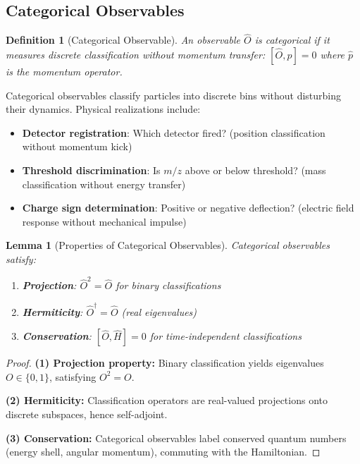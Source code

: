 \documentclass[twocolumn,10pt]{article}
\newtheorem{lemma}[theorem]{Lemma}
\newtheorem{definition}[theorem]{Definition}
\begin{document}
\subsection{Categorical Observables}

\begin{definition}[Categorical Observable]
\label{def:categorical}
An observable $\hat{O}$ is \emph{categorical} if it measures discrete classification without momentum transfer:
$
[\hat{O}, \hat{p}] = 0
$
where $\hat{p}$ is the momentum operator.
\end{definition}

Categorical observables classify particles into discrete bins without disturbing their dynamics. Physical realizations include:
\begin{itemize}
    \item \textbf{Detector registration}: Which detector fired? (position classification without momentum kick)
    \item \textbf{Threshold discrimination}: Is $m/z$ above or below threshold? (mass classification without energy transfer)
    \item \textbf{Charge sign determination}: Positive or negative deflection? (electric field response without mechanical impulse)
\end{itemize}

\begin{lemma}[Properties of Categorical Observables]
\label{lem:categorical_props}
Categorical observables satisfy:
\begin{enumerate}
    \item \textbf{Projection}: $\hat{O}^2 = \hat{O}$ for binary classifications
    \item \textbf{Hermiticity}: $\hat{O}^\dagger = \hat{O}$ (real eigenvalues)
    \item \textbf{Conservation}: $[\hat{O}, \hat{H}] = 0$ for time-independent classifications
\end{enumerate}
\end{lemma}

\begin{proof}
\textbf{(1) Projection property:} Binary classification yields eigenvalues $O \in \{0, 1\}$, satisfying $O^2 = O$.

\textbf{(2) Hermiticity:} Classification operators are real-valued projections onto discrete subspaces, hence self-adjoint.

\textbf{(3) Conservation:} Categorical observables label conserved quantum numbers (energy shell, angular momentum), commuting with the Hamiltonian.
\end{proof}
\end{document}
